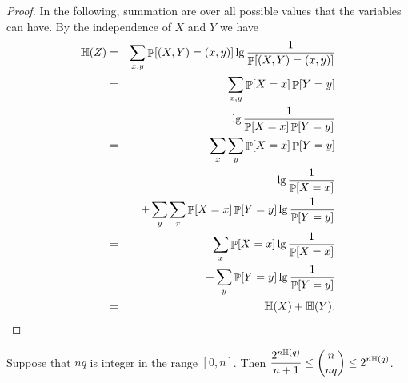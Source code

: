 \begin{proof}
    In the following, summation are over all possible values that the
    variables can have. By the independence of $X$ and $Y$ we have
    \begin{eqnarray*}
        \Entropy{Z} &=& \sum_{x,y} \Prob{ (X,Y) = (x,y)} \lg 
        \frac{1}{\Prob{ (X,Y) = (x,y)}} \\
        &= &
        \sum_{x,y} \Prob{ X = x} \Prob{Y = y} \\
        && \lg 
        \frac{1}{\Prob{ X = x} \Prob{ Y = y } } \\
        &= &
        \sum_x \sum_{y} \Prob{ X = x} \Prob{Y = y} \\
        && \lg 
        \frac{1}{\Prob{ X = x}  } 
        \\
        && + \sum_{y} \sum_x \Prob{ X = x} \Prob{Y = y} \lg 
        \frac{1}{\Prob{ Y = y } } \\
        &=& 
        \sum_x \Prob{ X = x} \lg 
        \frac{1}{\Prob{ X = x}  } \\
        && + \sum_{y}  \Prob{Y = y} \lg 
        \frac{1}{\Prob{ Y = y } } \\
        &=& \Entropy{X} + \Entropy{Y}.
    \end{eqnarray*}
\end{proof}

\begin{lemma}
    Suppose that $nq$ is integer in the range $[0,n]$. Then
    $\displaystyle \frac{2^{n\EntropyX{q}}}{n+1} \leq \binom{n}{nq}
    \leq 2^{n \EntropyX{q}}$.

\end{lemma}

